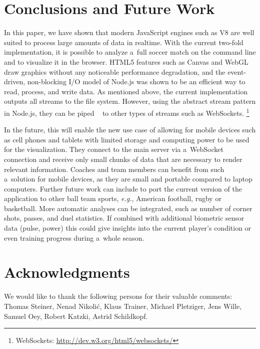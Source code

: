 \documentclass{sig-alternate}
\newcommand{\inlinelistingsize}{\fontsize{8pt}{11pt}}
\let\oldurl\url
\renewcommand{\url}[1]{\inlinelistingsize\oldurl{#1}}
\begin{document}
\section{Conclusions and Future Work}
\label{sec:conclusions-future-work}

In this paper, we have shown
that modern JavaScript engines such as V8
are well suited to process large amounts of data in realtime.
With the current two-fold implementation, it is possible to analyze a~full soccer match
on the command line and to visualize it in the browser.
HTML5 features such as Canvas and WebGL draw graphics
without any noticeable performance degradation,
and the event-driven, non-blocking I/O model of Node.js
was shown to be an efficient way to read, process, and write data.
As mentioned above, the current implementation
outputs all streams to the file system.
However, using the abstract stream pattern in Node.js,
they can be piped%
~\cite{ogden2012nodestreams}
to other types of streams such as WebSockets.%
\footnote{WebSockets: \url{http://dev.w3.org/html5/websockets/}}

In the future, this will enable the new use case of
allowing for  mobile devices such as cell phones and tablets
with limited storage
and computing power to be used for the visualization.
They connect to the main server via a~WebSocket connection
and receive only small chunks of data that are necessary
to render relevant information.
Coaches and team members can benefit from such a~solution
for mobile devices, as they are small and portable
compared to laptop computers.
Further future work can include to port the current version of the application
to other ball team sports, \emph{e.g.}, American football,
rugby or basketball.
More automatic analyses can be integrated,
such as number of corner shots, passes, and duel statistics.
If combined with additional biometric sensor data (pulse, power)
this could give insights into the current player's condition
or even training progress during a~whole season.

\section*{Acknowledgments}
We would like to thank the following persons for their valuable comments: Thomas Steiner, Nenad Nikolić, Klaus Trainer, Michael Pletziger, Jens Wille, Samuel Oey, Robert Katzki, Astrid Schildkopf.

\balancecolumns


\end{document}
